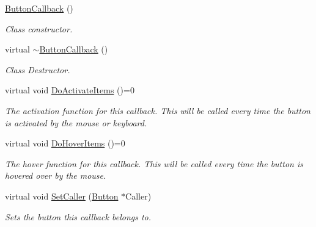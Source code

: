 \begin{DoxyCompactItemize}
\item 
\hyperlink{classMezzanine_1_1UI_1_1ButtonCallback_af7cd7252696a7c4a47e0753eeef41d72}{ButtonCallback} ()
\begin{DoxyCompactList}\small\item\em Class constructor. \item\end{DoxyCompactList}\item 
\hypertarget{classMezzanine_1_1UI_1_1ButtonCallback_a2db8a95ef38e7036d3e31cbf01e8f126}{
virtual \hyperlink{classMezzanine_1_1UI_1_1ButtonCallback_a2db8a95ef38e7036d3e31cbf01e8f126}{$\sim$ButtonCallback} ()}
\label{classMezzanine_1_1UI_1_1ButtonCallback_a2db8a95ef38e7036d3e31cbf01e8f126}

\begin{DoxyCompactList}\small\item\em Class Destructor. \item\end{DoxyCompactList}\item 
\hypertarget{classMezzanine_1_1UI_1_1ButtonCallback_a4e5b608adea7aa2b8589f2b1644ef698}{
virtual void \hyperlink{classMezzanine_1_1UI_1_1ButtonCallback_a4e5b608adea7aa2b8589f2b1644ef698}{DoActivateItems} ()=0}
\label{classMezzanine_1_1UI_1_1ButtonCallback_a4e5b608adea7aa2b8589f2b1644ef698}

\begin{DoxyCompactList}\small\item\em The activation function for this callback. This will be called every time the button is activated by the mouse or keyboard. \item\end{DoxyCompactList}\item 
\hypertarget{classMezzanine_1_1UI_1_1ButtonCallback_a03454a17a979a86a72a0c3afae69737f}{
virtual void \hyperlink{classMezzanine_1_1UI_1_1ButtonCallback_a03454a17a979a86a72a0c3afae69737f}{DoHoverItems} ()=0}
\label{classMezzanine_1_1UI_1_1ButtonCallback_a03454a17a979a86a72a0c3afae69737f}

\begin{DoxyCompactList}\small\item\em The hover function for this callback. This will be called every time the button is hovered over by the mouse. \item\end{DoxyCompactList}\item 
\hypertarget{classMezzanine_1_1UI_1_1ButtonCallback_a59e06318745a208789d21bde7ad01349}{
virtual void \hyperlink{classMezzanine_1_1UI_1_1ButtonCallback_a59e06318745a208789d21bde7ad01349}{SetCaller} (\hyperlink{classMezzanine_1_1UI_1_1Button}{Button} $\ast$Caller)}
\label{classMezzanine_1_1UI_1_1ButtonCallback_a59e06318745a208789d21bde7ad01349}

\begin{DoxyCompactList}\small\item\em Sets the button this callback belongs to. \item\end{DoxyCompactList}\end{DoxyCompactItemize}
